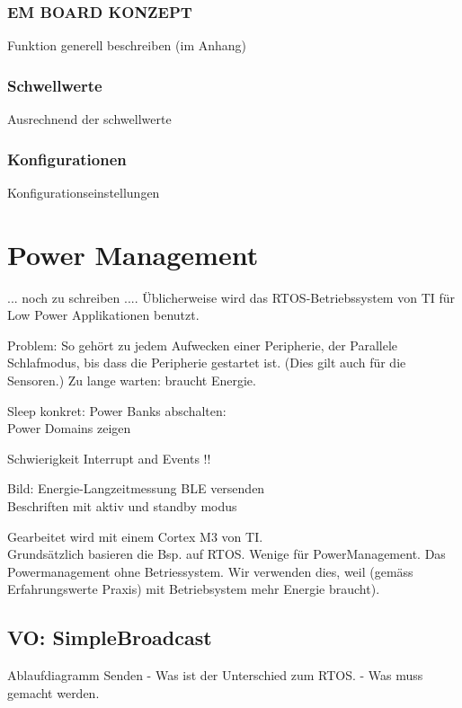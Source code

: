 \subsubsection*{EM BOARD KONZEPT}
Funktion generell beschreiben (im Anhang) 
\subsubsection*{Schwellwerte}
Ausrechnend der schwellwerte
\subsubsection*{Konfigurationen}
Konfigurationseinstellungen



\section{Power Management}

... noch zu schreiben ....
Üblicherweise wird das RTOS-Betriebssystem von TI für Low Power Applikationen benutzt. 


Problem: So gehört zu jedem Aufwecken einer Peripherie, der Parallele Schlafmodus, bis dass die Peripherie gestartet ist. (Dies gilt auch für die Sensoren.) Zu lange warten: braucht Energie.

Sleep konkret: Power Banks abschalten:\\
Power Domains zeigen

Schwierigkeit Interrupt and Events !!

Bild: Energie-Langzeitmessung BLE versenden\\
Beschriften mit aktiv und standby modus


Gearbeitet wird mit einem Cortex M3 von TI.\\ 
Grundsätzlich basieren die Bsp. auf RTOS. Wenige für PowerManagement. Das Powermanagement ohne Betriessystem. Wir verwenden dies, weil (gemäss Erfahrungswerte Praxis) mit Betriebsystem mehr Energie braucht).

\subsection{VO: SimpleBroadcast}

Ablaufdiagramm Senden
- Was ist der Unterschied zum RTOS.
- Was muss gemacht werden.

